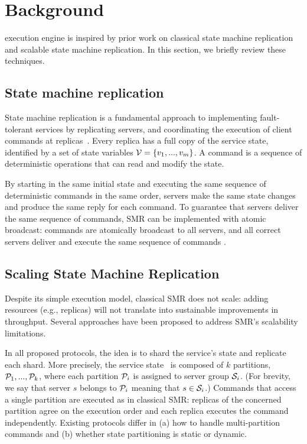 \section{Background}
\label{sec:background}


\dynastar execution engine is inspired by prior work on classical state machine replication and scalable state machine replication.
In this section, we briefly review these techniques. 

\subsection{State machine replication}
\label{sec:smr}

State machine replication is a fundamental approach to implementing fault-tolerant services by replicating servers, and coordinating the execution of client commands at replicas~\cite{Lam78,Sch90}. 
Every replica has a full copy of the service state, identified by a set of state variables $\mathcal{V} = \{v_1, ..., v_m\}$.
A command is a sequence of deterministic operations that can read and modify the state.

By starting in the same initial state and executing the same sequence of deterministic commands in the same order, servers make the same state changes and produce the same reply for each command. 
To guarantee that servers deliver the same sequence of commands, SMR can be implemented with atomic broadcast: commands are atomically broadcast to all servers, and all correct servers deliver and execute the same sequence of commands \cite{BJ87b,DSU04}.


\subsection{Scaling State Machine Replication}

Despite its simple execution model, classical SMR does not scale: adding resources (e.g., replicas) will not translate into sustainable improvements in throughput. 
Several approaches have been proposed to address SMR's scalability limitations.

In all proposed protocols, the idea is to shard the service's state and replicate each shard.
More precisely, the service state \vvt\ is composed of $k$ partitions, $\mathcal{P}_1, ..., \mathcal{P}_k$, where each partition $\mathcal{P}_i$ is assigned to server group $\mathcal{S}_i$. 
(For brevity, we say that server $s$ belongs to $\mathcal{P}_i$ meaning that $s \in \mathcal{S}_i$.)
%
Commands that access a single partition are executed as in classical SMR: replicas of the concerned partition agree on the execution order and each replica executes the command independently. 
Existing protocols differ in (a) how to handle multi-partition commands and (b) whether state partitioning is static or dynamic.


